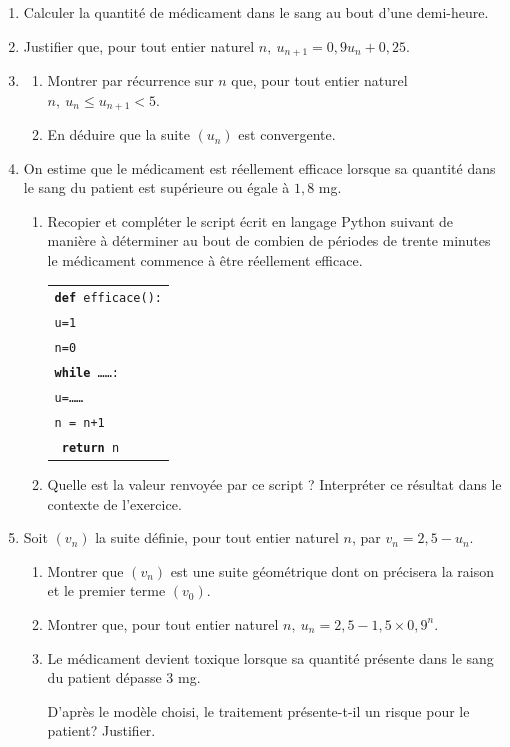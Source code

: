 \begin{enumerate}
\item Calculer la quantité de médicament dans le sang au bout d'une demi-heure.
\item Justifier que, pour tout entier naturel $n,\: u_{n+1} = 0,9u_n + 0,25$.
\item 
	\begin{enumerate}
		\item Montrer par récurrence sur $n$ que, pour tout entier naturel $n,\: u_n \leqslant  u_{n+1} < 5$.
		\item En déduire que la suite $\left(u_n\right)$ est convergente.
	\end{enumerate}
\item On estime que le médicament est réellement efficace lorsque sa quantité dans le sang
du patient est supérieure ou égale à $1,8$ mg.
	\begin{enumerate}
		\item Recopier et compléter le script écrit en langage Python suivant de manière à déterminer au bout de combien de périodes de trente minutes le médicament commence à être réellement efficace.
\begin{center}
\begin{tabular}{|l|}\hline
\texttt{\textbf{def} efficace():}\\
\quad \texttt{u=1}\\
\quad \texttt{n=0}\\
\quad \texttt{\textbf{while} \ldots\ldots :}\\
\quad\qquad \texttt{u=\ldots\ldots}\\
\quad\qquad \texttt{n = n+1}\\
\quad \texttt{\textbf{ return }n}\\ \hline
\end{tabular}
\end{center}

		\item Quelle est la valeur renvoyée par ce script ? Interpréter ce résultat dans le contexte de l'exercice.
	\end{enumerate}		
\item Soit $\left(v_n\right)$ la suite définie, pour tout entier naturel $n$, par $v_n = 2,5 - u_n$.
	\begin{enumerate}
		\item Montrer que $\left(v_n\right)$ est une suite géométrique dont on précisera la raison et le premier terme $\left(v_0\right)$.
		\item Montrer que, pour tout entier naturel $n,\: u_n = 2,5 - 1,5 \times 0,9^n$.
		\item Le médicament devient toxique lorsque sa quantité présente dans le sang du patient dépasse $3$ mg. 
		
D'après le modèle choisi, le traitement présente-t-il un risque pour le patient? Justifier.
	\end{enumerate}
\end{enumerate}

